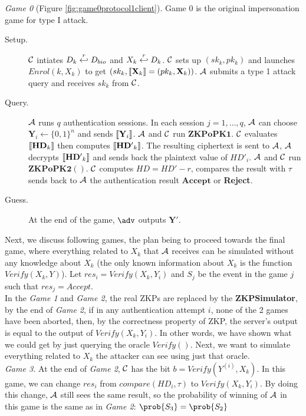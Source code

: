 \textit{Game 0} (Figure \ref{fig:game0protocol1client}). Game 0 is the original
impersonation game for type I attack.
\begin{description}
\item [Setup.] $\mathcal{C}$ intiates $D_k \stackrel{r}{\hookleftarrow} D_{bio}$ and
  $X_k \stackrel{r}{\hookleftarrow} D_k$. $\mathcal{C}$ sets up $(sk_k, pk_k)$ and launches
  $Enrol(k, X_k)$ to get $(sk_k, \left\llbracket\mathbf{X}_{k}\right\rrbracket =(pk_k, \mathbf{X}_{k}))$.
  $\mathcal{A}$ submits a type 1 attack query and receives $sk_k$ from
  $\mathcal{C}$.
\item [Query.] $\mathcal{A}$ runs $q$ authentication sessions. In each session
  $j = 1, \dots, q$, $\mathcal{A}$ can choose $\mathbf{Y}_{i} \gets \{0,1\}^{n}$
  and sends $\left\llbracket\mathbf{Y}_{i}\right\rrbracket$. $\mathcal{A}$ and $\mathcal{C}$ run
  $\mathbf{ZKPoPK1}$. $\mathcal{C}$ evaluates $\left\llbracket\mathbf{HD}_{k}\right\rrbracket$ then
  computes $\left\llbracket\mathbf{HD'}_{k}\right\rrbracket$. The resulting ciphertext is sent to
  $\mathcal{A}$, $\mathcal{A}$ decrypts $\left\llbracket\mathbf{HD'}_{k}\right\rrbracket$ and sends back the
  plaintext value of $HD'_{i}$. $\mathcal{A}$ and $\mathcal{C}$ run
  $\mathbf{ZKPoPK2}()$. $\mathcal{C}$ computes $HD = HD' - r$, compares the result with $\tau$ sends back to $\mathcal{A}$ the authentication result $\mathbf{Accept}$ or \textbf{Reject}.
\item [Guess.] At the end of the game, $\adv$ outputs $\mathbf{Y'}$.
\end{description}

Next, we discuss following games, the plan being to proceed towards the final
game, where everything related to $X_k$ that $\mathcal{A}$ receives can be simulated
without any knowledge about $X_k$ (the only known information about $X_k$ is the
function $Verify(X_k, Y)$). Let $res_i = Verify(X_k, Y_{i})$ and $S_j$ be
the event in the game $j$ such that $res_j = Accept$.\\

In the \textit{Game 1} and \textit{Game 2}, the real ZKPs are replaced by the
\textbf{ZKPSimulator}, by the end of \textit{Game 2}, if in any authentication
attempt $i$, none of the 2 games have been aborted, then, by the correctness
property of ZKP, the server's output is equal to the output of
$Verify(X_k, Y_{i})$. In other words, we have shown what we could get by just
querying the oracle $Verify()$. Next, we want to simulate everything related to
$X_k$ the attacker
can see using just that oracle.\\

\textit{Game 3.} At the end of \textit{Game 2}, $\mathcal{C}$ has the bit
$b = Verify(Y^{(i)},X_k)$. In this game, we can change $res_{i}$ from
$compare(HD_{i},\tau)$ to $Verify(X_{k},Y_{i})$. By doing this change,
$\mathcal{A}$ still sees the same result, so the probability of winning of
$\mathcal{A}$ in this game is the same as in \textit{Game 2}: $\prob{S_{3}} = \prob{S_{2}}$
\\

